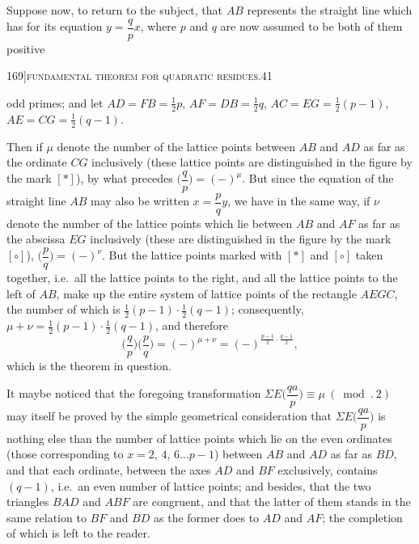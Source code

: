 \documentclass[11pt]{article}
\begin{document}
Suppose now, to return to the subject, that $AB$ represents the straight line which
has for its equation $y = \dfrac{q}{p} x$, where $p$ and $q$ are now assumed to be both of them positive

\newpage

\begin{center}
\small 169]\hfill\textsc{fundamental theorem for quadratic residues.}\hfill\textsc{41}
\end{center}

\medskip

\noindent odd primes; and let $AD = FB = \tfrac{1}{2} p$, $AF = DB = \tfrac{1}{2} q$, $AC = EG = \tfrac{1}{2}(p - 1)$, $AE = CG = \tfrac{1}{2}(q - 1)$.

Then if $\mu$ denote the number of the lattice points between $AB$ and $AD$ as far as
the ordinate $CG$ inclusively (these lattice points are distinguished in the figure by the
mark $[\ast]$), by what precedes $\biggl(\dfrac{q}{p}\biggr) = (-)^{\mu}$. But since the equation of the straight line
$AB$ may also be written $x = \dfrac{p}{q} y$, we have in the same way, if $\nu$ denote the number
of the lattice points which lie between $AB$ and $AF$ as far as the abscissa $EG$
inclusively (these are distinguished in the figure by the mark $[\circ]$), $\biggl(\dfrac{p}{q}\biggr) = (-)^{\nu}$. But
the lattice points marked with $[\ast]$ and $[\circ]$ taken together, i.e.\ all the lattice points
to the right, and all the lattice points to the left of $AB$, make up the entire system
of lattice points of the rectangle $AEGC$, the number of which is $\tfrac{1}{2}(p - 1)\cdot\tfrac{1}{2}(q - 1)$;
consequently, $\mu + \nu = \tfrac{1}{2}(p - 1)\cdot\tfrac{1}{2}(q - 1)$, and therefore
\[
\biggl(\frac{q}{p}\biggr)\biggl(\frac{p}{q}\biggr) = (-)^{\mu + \nu} = (-)^{\frac{p-1}{2}\cdot\frac{q-1}{2}},
\]
which is the theorem in question.

It maybe noticed that the foregoing transformation $\Sigma E\biggl(\dfrac{q a}{p}\biggr) \equiv \mu\ (\bmod.\ 2)$ may itself
be proved by the simple geometrical consideration that $\Sigma E\biggl(\dfrac{q a}{p}\biggr)$ is nothing else than the
number of lattice points which lie on the even ordinates (those corresponding to
$x = 2$, $4$, $6\ldots p - 1$) between $AB$ and $AD$ as far as $BD$, and that each ordinate,
between the axes $AD$ and $BF$ exclusively, contains $(q - 1)$, i.e.\ an even number of
lattice points; and besides, that the two triangles $BAD$ and $ABF$ are congruent, and
that the latter of them stands in the same relation to $BF$ and $BD$ as the former
does to $AD$ and $AF$; the completion of which is left to the reader.
\end{document}
